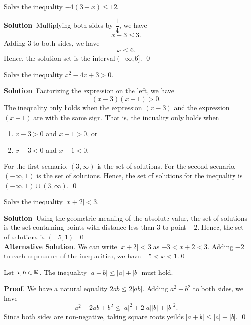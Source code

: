 \documentclass[11pt]{book}
\begin{document}
\begin{example}
    Solve the inequality $-4(3-x)\leq 12.$
\end{example}
\textbf{Solution}. Multiplying both sides by $\dfrac{1}{4}$, we have $$x-3\leq 3.$$ Adding $3$ to both sides, we have $$x\leq 6.$$ Hence, the solution set is the interval $(-\infty, 6]$. \qed

\begin{example}
    Solve the inequality $x^2-4x+3>0.$
\end{example}
\textbf{Solution}. Factorizing the expression on the left, we have $$(x-3)(x-1)>0.$$ The inequality only holds when the expression $(x-3)$ and the expression $(x-1)$ are with the same sign. That is, the inquality only holds when \begin{enumerate}
    \item $x-3>0$ and $x-1>0$, or
    \item $x-3<0$ and $x-1<0$.
\end{enumerate}
For the first scenario, $(3, \infty)$ is the set of solutions. For the second scenario, $(-\infty, 1)$ is the set of solutions. Hence, the set of solutions for the inequality is $(-\infty, 1)\cup(3, \infty)$. \qed

\begin{example}
    Solve the inequality $|x+2|<3.$
\end{example}
\textbf{Solution}. Using the geometric meaning of the absolute value, the set of solutions is the set containing points with distance less than $3$ to point $-2$. Hence, the set of solutions is $(-5, 1)$. \qed\\
\textbf{Alternative Solution}. We can write $|x+2|<3$ as $-3<x+2<3.$ Adding $-2$ to each expression of the inequalities, we have $-5<x<1.$\qed

\begin{theorem}
    Let $a, b\in\mathbb{R}$. The inequality $|a+b|\leq |a|+|b|$ must hold.
\end{theorem}
\textbf{Proof}. We have a natural equality $2ab\leq2|ab|$. Adding $a^2+b^2$ to both sides, we have $$a^2+2ab+b^2\leq |a|^2+2|a||b|+|b|^2.$$ Since both sides are non-negative, taking square roots yeilds $|a+b|\leq |a|+|b|.$ \qed
\end{document}
